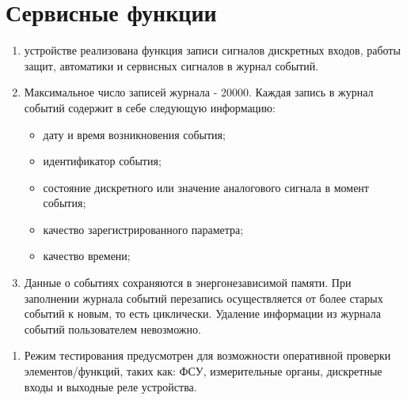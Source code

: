 \color{uniblue}\section[Сервисные функции]{Сервисные функции}\label{sec:servfuncs}
\color{black}



\color{black}

\begin{enumerate}

\item
устройстве реализована функция записи сигналов дискретных входов, работы защит, автоматики и сервисных сигналов в журнал событий.
\item
Максимальное число записей журнала - 20000. Каждая запись в журнал событий содержит в себе следующую информацию:
\begin{itemize}
    \item дату и время возникновения события;
    \item идентификатор события;
    \item состояние дискретного или значение аналогового сигнала в момент события;
    \item качество зарегистрированного параметра;
    \item качество времени;
\end{itemize}
\item
Данные о событиях сохраняются в энергонезависимой памяти. При заполнении журнала событий перезапись осуществляется от более старых событий к новым, то есть циклически. Удаление информации из журнала событий пользователем невозможно.

\end{enumerate}

\color{black}

\begin{enumerate}

\item
Режим тестирования предусмотрен для возможности оперативной проверки элементов/функций, таких как: ФСУ, измерительные органы, дискретные входы и выходные реле устройства.

\end{enumerate}

